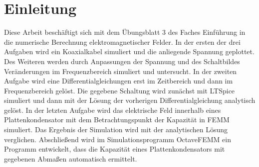\chapter{Einleitung}\label{sec:intro}
Diese Arbeit beschäftigt sich mit dem Übungsblatt 3 des Faches \glqq Einführung in die numerische Berechnung elektromagnetischer Felder\grqq{}. In der ersten der drei Aufgaben wird ein Koaxialkabel simuliert und die anliegende Spannung geplottet. Des Weiteren werden durch Anpassungen der Spannung und des Schaltbildes Veränderungen im Frequenzbereich simuliert und untersucht. 
In der zweiten Aufgabe wird eine Differentialgleichungen erst im Zeitbereich und dann im Frequenzbereich gelöst. Die gegebene Schaltung wird zunächst mit LTSpice simuliert und dann mit der Lösung der vorherigen Differentialgleichung analytisch gelöst.
In der letzten Aufgabe wird das elektrische Feld innerhalb eines Plattenkondensator mit dem Betrachtungspunkt der Kapazität in FEMM simuliert. Das Ergebnis der Simulation wird mit der analytischen Lösung verglichen. Abschließend wird im Simulationsprogramm \glqq OctaveFEMM\grqq{} ein Programm entwickelt, dass die Kapazität eines Plattenkondensators mit gegebenen Abmaßen automatisch ermittelt.